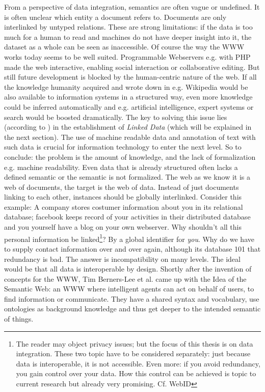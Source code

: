 From a perspective of data integration, semantics are often vague or undefined. It is often unclear which entity a document refers to. Documents are only interlinked by untyped relations. These are strong limitations: if the data is too much for a human to read and machines do not have deeper insight into it, the dataset as a whole can be seen as inaccessible. Of course the way the WWW works today seems to be well suited. Programmable Webservers e.g. with PHP made the web interactive, enabling social interaction or collaborative editing. But still future development is blocked by the human-centric nature of the web. If all the knowledge humanity acquired and wrote down in e.g. Wikipedia would be also available to information systems in a structured way, even more knowledge could be inferred automatically and e.g. artificial intelligence, expert systems or search would be boosted dramatically. The key to solving this issue lies (according to \cite{berners}) in the establishment of \textit{Linked Data} (which will be explained in the next section). The use of machine readable data and annotation of text with such data is crucial for information technology to enter the next level.
So to conclude: the problem is the amount of knowledge, and the lack of formalization e.g. machine readability. Even data that is already structured often lacks a defined semantic or the semantic is not formalized. The web as we know it is a web of documents, the target is the web of data. Instead of just documents linking to each other, instances should be globally interlinked. Consider this example: A company stores costumer information about you in its relational database; facebook keeps record of your activities in their distributed database and you yourself have a blog on your own webserver. Why shouldn't all this personal information be linked\footnote{The reader may object privacy issues; but the focus of this thesis is on data integration. These two topic have to be considered separately: just because data is interoperable, it is not accessible. Even more: if you avoid redundancy, you gain control over your data. How this control can be achieved is topic to current research but already very promising. Cf. WebID}? By a global identifier for \textit{you}. Why do we have to supply contact information over and over again, although its database 101 that redundancy is bad. The answer is incompatibility on many levels. The ideal would be that all data is interoperable by design. Shortly after the invention of concepts for the WWW, Tim Berners-Lee et al. came up with the Idea of the Semantic Web: an WWW where intelligent agents can act on behalf of users, to find information or communicate. They have a shared syntax and vocabulary, use ontologies as background knowledge and thus get deeper to the intended semantic of things.
